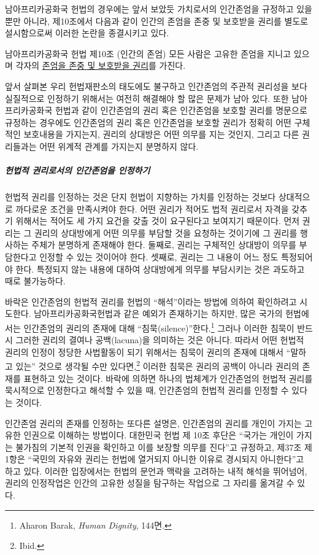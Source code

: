 남아프리카공화국 헌법의 경우에는 앞서 보았듯 가치로서의 인간존엄을 규정하고 있을 뿐만 아니라, 제10조에서 다음과 같이 인간의 존엄을 존중 및 보호받을 권리를 별도로 설시함으로써 이러한 논란을 종결시키고 있다.

\begin{displayquote}
남아프리카공화국 헌법 제10조 (인간의 존엄) 모든 사람은 고유한 존엄을 지니고 있으며 각자의 \ul{존엄을 존중 및 보호받을 권리}를 가진다.
\end{displayquote}

앞서 살펴본 우리 헌법재판소의 태도에도 불구하고 인간존엄의 주관적 권리성을 보다 실질적으로 인정하기 위해서는 여전히 해결해야 할 많은 문제가 남아 있다. 또한 남아프리카공화국 헌법과 같이 인간존엄의 권리 혹은 인간존엄을 보호할 권리를 명문으로 규정하는 경우에도 인간존엄의 권리 혹은 인간존엄을 보호할 권리가 정확히 어떤 구체적인 보호내용을 가지는지, 권리의 상대방은 어떤 의무를 지는 것인지, 그리고 다른 권리들과는 어떤 위계적 관계를 가지는지 분명하지 않다.

\subparagraph{헌법적 권리로서의 인간존엄을 인정하기}

헌법적 권리를 인정하는 것은 단지 헌법이 지향하는 가치를 인정하는 것보다 상대적으로 까다로운 조건을 만족시켜야 한다. 어떤 권리가 적어도 법적 권리로서 자격을 갖추기 위해서는 적어도 세 가지 요건을 갖출 것이 요구된다고 보여지기 때문이다. 먼저 권리는 그 권리의 상대방에게 어떤 의무를 부담할 것을 요청하는 것이기에 그 권리를 행사하는 주체가 분명하게 존재해야 한다. 둘째로, 권리는 구체적인 상대방이 의무를 부담한다고 인정할 수 있는 것이어야 한다. 셋째로, 권리는 그 내용이 어느 정도 특정되어야 한다. 특정되지 않는 내용에 대하여 상대방에게 의무를 부담시키는 것은 과도하고 때로 불가능하다.

바락은 인간존엄의 헌법적 권리를 헌법의 ``해석''이라는 방법에 의하여 확인하려고 시도한다. 남아프리카공화국헌법과 같은 예외가 존재하기는 하지만, 많은 국가의 헌법에서는 인간존엄의 권리의 존재에 대해 ``침묵(silence)''한다.\footnote{Aharon Barak, \emph{Human Dignity}, 144면.} 그러나 이러한 침묵이 반드시 그러한 권리의 결여나 공백(lacuna)을 의미하는 것은 아니다. 따라서 어떤 헌법적 권리의 인정이 정당한 사법활동이 되기 위해서는 침묵이 권리의 존재에 대해서 ``말하고 있는'' 것으로 생각될 수만 있다면,\footnote{Ibid.} 이러한 침묵은 권리의 공백이 아니라 권리의 존재를 표현하고 있는 것이다. 바락에 의하면 하나의 법체계가 인간존엄의 헌법적 권리를 묵시적으로 인정한다고 해석할 수 있을 때, 인간존엄의 헌법적 권리를 인정할 수 있다는 것이다.

인간존엄 권리의 존재를 인정하는 또다른 설명은, 인간존엄의 권리를 개인이 가지는 고유한 인권으로 이해하는 방법이다. 대한민국 헌법 제 10조 후단은 ``국가는 개인이 가지는 불가침의 기본적 인권을 확인하고 이를 보장할 의무를 진다''고 규정하고, 제37조 제1항은 ``국민의 자유와 권리는 헌법에 열거되지 아니한 이유로 경시되지 아니한다''고 하고 있다. 이러한 입장에서는 헌법의 문언과 맥락을 고려하는 내적 해석을 뛰어넘어, 권리의 인정작업은 인간의 고유한 성질을 탐구하는 작업으로 그 자리를 옮겨갈 수 있다.


